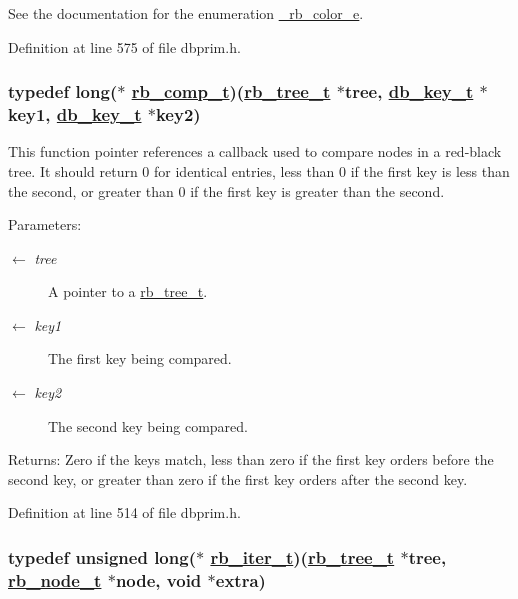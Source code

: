 See the documentation for the enumeration \hyperlink{group__dbprim__rbtree_ga53}{\_\-rb\_\-color\_\-e}.

Definition at line 575 of file dbprim.h.\hypertarget{group__dbprim__rbtree_ga3}{
\subsubsection[rb\_\-comp\_\-t]{\setlength{\rightskip}{0pt plus 5cm}typedef long($\ast$ \hyperlink{group__dbprim__rbtree_ga3}{rb\_\-comp\_\-t})(\hyperlink{struct__rb__tree__s}{rb\_\-tree\_\-t} $\ast$tree, \hyperlink{struct__db__key__s}{db\_\-key\_\-t} $\ast$key1, \hyperlink{struct__db__key__s}{db\_\-key\_\-t} $\ast$key2)}}
\label{group__dbprim__rbtree_ga3}


This function pointer references a callback used to compare nodes in a red-black tree. It should return 0 for identical entries, less than 0 if the first key is less than the second, or greater than 0 if the first key is greater than the second.

\begin{Desc}
\item[Parameters:]
\begin{description}
\item[\mbox{$\leftarrow$} {\em tree}]A pointer to a \hyperlink{group__dbprim__rbtree_ga0}{rb\_\-tree\_\-t}. \item[\mbox{$\leftarrow$} {\em key1}]The first key being compared. \item[\mbox{$\leftarrow$} {\em key2}]The second key being compared.\end{description}
\end{Desc}
\begin{Desc}
\item[Returns:]Zero if the keys match, less than zero if the first key orders before the second key, or greater than zero if the first key orders after the second key.\end{Desc}


Definition at line 514 of file dbprim.h.\hypertarget{group__dbprim__rbtree_ga2}{
\subsubsection[rb\_\-iter\_\-t]{\setlength{\rightskip}{0pt plus 5cm}typedef unsigned long($\ast$ \hyperlink{group__dbprim__rbtree_ga2}{rb\_\-iter\_\-t})(\hyperlink{struct__rb__tree__s}{rb\_\-tree\_\-t} $\ast$tree, \hyperlink{struct__rb__node__s}{rb\_\-node\_\-t} $\ast$node, void $\ast$extra)}}
\label{group__dbprim__rbtree_ga2}


